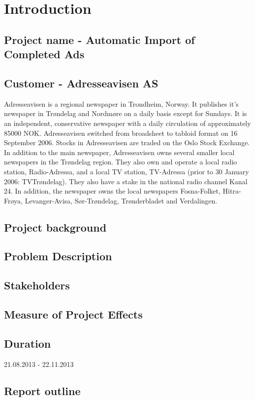 \section{Introduction}
\subsection{Project name - Automatic Import of Completed Ads}
\subsection{Customer - Adresseavisen AS}
Adresseavisen is a regional newspaper in Trondheim, Norway. It publishes it's newspaper in Trøndelag and Nordmøre on a daily basis except for Sundays. It is an independent, conservative newspaper with a daily circulation of approximately 85000 NOK. 
Adresseavisen switched from broadsheet to tabloid format on 16 September 2006. Stocks in Adresseavisen are traded on the Oslo Stock Exchange.\\
In addition to the main newspaper, Adresseavisen owns several smaller local newspapers in the Trøndelag region. They also own and operate a local radio station, Radio-Adressa, and a local TV station, TV-Adressa (prior to 30 January 2006: TVTrøndelag). They also have a stake in the national radio channel Kanal 24. In addition, the newspaper owns the local newspapers Fosna-Folket, Hitra-Frøya, Levanger-Avisa, Sør-Trøndelag, Trønderbladet and Verdalingen. %


\subsection{Project background}
\subsection{Problem Description}
\subsection{Stakeholders}
\subsection{Measure of Project Effects}
\subsection{Duration}
21.08.2013 - 22.11.2013
\subsection{Report outline}